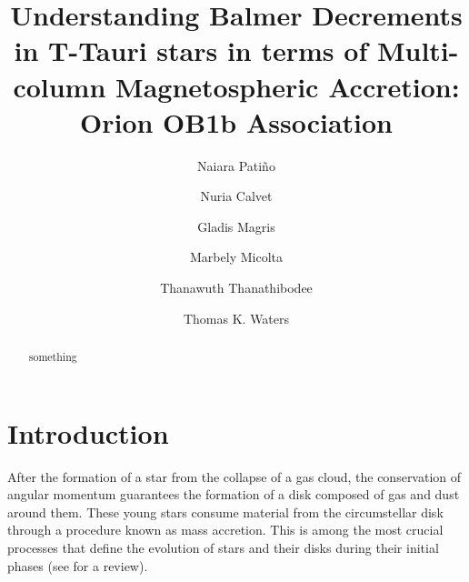\documentclass[twocolumn,linenumbers]{aastex631}
\begin{document}
\title{Understanding Balmer Decrements in T-Tauri stars in terms of Multi-column Magnetospheric Accretion: Orion OB1b Association}


\author[0009-0009-7455-6777]{Naiara Patiño}

\author[0000-0002-3950-5386]{Nuria Calvet}

\author[0000-0003-1166-5123]{Gladis Magris}

\author[0000-0001-8022-4378]{Marbely Micolta}

\author[0000-0003-4507-1710]{Thanawuth Thanathibodee}

\author[0000-0002-5231-7240]{Thomas K. Waters}




\begin{abstract}

    something
    
\end{abstract}


\section{Introduction}

After the formation of a star from the collapse of a gas cloud, the conservation of angular momentum guarantees the formation of a disk composed of gas and dust around them. These young stars consume material from the circumstellar disk through a procedure known as mass accretion. This is among the most crucial processes that define the evolution of stars and their disks during their initial phases (see \citet{hartmann2016} for a review).
\end{document}
